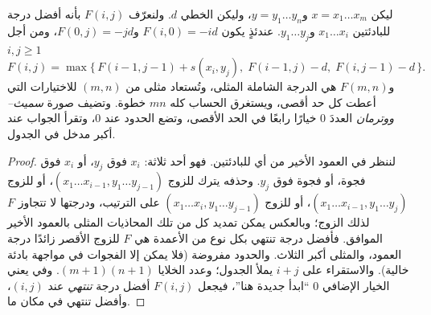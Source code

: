 \begin{theorem}\label{thm:b3:bioinformatics:nw}
ليكن $x = x_{1}\dots x_{m}$ و$y = y_{1}\dots y_{n}$، وليكن  الخطي $d$. ولنعرّف $F(i,j)$ بأنه أفضل درجة 
للبادئتين $x_{1}\dots x_{i}$ و$y_{1}\dots y_{j}$. عندئذٍ يكون
$F(i,0) = -id$ و$F(0,j) = -jd$، ومن أجل $i,j \ge 1$
\[
F(i,j) = \max\bigl\{\,F(i-1,j-1) + s(x_{i},y_{j}),\;
F(i-1,j) - d,\; F(i,j-1) - d\,\bigr\}.
\]
و$F(m,n)$ هي الدرجة الشاملة المثلى، وتُستعاد  مثلى
 من $(m,n)$ للاختيارات التي أعطت كل حد أقصى،
ويستغرق الحساب كله $mn$ خطوة. وتضيف صورة
\emph{سميث--ووترمان}  العددَ $0$ خيارًا رابعًا في الحد الأقصى،
وتضع الحدود عند $0$، وتقرأ الجواب عند أكبر مدخل في
الجدول.
\end{theorem}
\begin{proof}
لننظر في العمود الأخير من أي  للبادئتين. فهو
أحد ثلاثة: $x_{i}$ فوق $y_{j}$، أو $x_{i}$ فوق فجوة، أو فجوة
فوق $y_{j}$. وحذفه يترك  للزوج $(x_{1}\dots x_{i-1},
y_{1}\dots y_{j-1})$، أو للزوج $(x_{1}\dots x_{i-1}, y_{1}\dots y_{j})$، أو للزوج
$(x_{1}\dots x_{i}, y_{1}\dots y_{j-1})$ على الترتيب، ودرجتها
لا تتجاوز $F$ لذلك الزوج؛ وبالعكس يمكن تمديد كل  من تلك
المحاذيات المثلى بالعمود الأخير الموافق. فأفضل درجة
تنتهي بكل نوع من الأعمدة هي $F$ للزوج الأقصر زائدًا
درجة العمود، والمثلى أكبر الثلاث. والحدود
مفروضة (فلا يمكن إلا الفجوات في مواجهة بادئة خالية).
والاستقراء على $i + j$ يملأ الجدول؛ وعدد الخلايا $(m+1)(n+1)$.
وفي  يعني الخيار الإضافي $0$ ``ابدأ  جديدة
هنا''، فيجعل $F(i,j)$ أفضل درجة  \emph{تنتهي}
عند $(i,j)$، وأفضل  تنتهي في مكان ما.
\end{proof}

